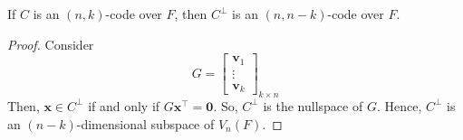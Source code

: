 \begin{Theorem}{}{}
    If $ C $ is an $ (n,k) $-code over $ F $, then $ C^{\perp} $ is an
    $ (n,n-k) $-code over $ F $.
\end{Theorem}

\begin{proof}
    Consider
    \[ G=\begin{bmatrix}
            \bm{v}_1 \\
            \vdots   \\
            \bm{v}_k
        \end{bmatrix}_{k\times n} \]
    Then, $ \bm{x}\in C^{\perp} $ if and only if $ G \bm{x}^{\top}=\bm{0} $. So, $ C^{\perp} $
    is the nullspace of $ G $. Hence, $ C^{\perp} $ is an
    $ (n-k) $-dimensional subspace of $ V_n(F) $.
\end{proof}
